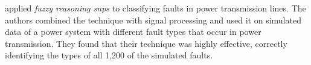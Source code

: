 \citeauthor{Huang2016} \cite{Huang2016} applied \emph{fuzzy reasoning \gls{snps}} to classifying faults in power transmission lines.  The authors combined the technique with signal processing and used it on simulated data of a power system with different fault types that occur in power transmission.  They found that their technique was highly effective, correctly identifying the types of all 1,200 of the simulated faults.



